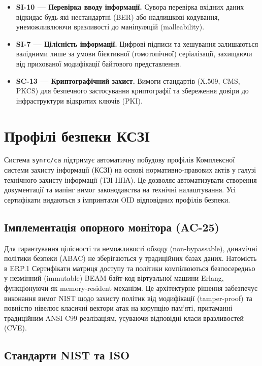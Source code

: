 \begin{itemize}
    \item \textbf{SI-10 — Перевірка вводу інформації.}
          Сувора перевірка вхідних даних відкидає будь-які нестандартні (BER) або надлишкові
          кодування, унеможливлюючи вразливості до маніпуляцій (malleability).

    \item \textbf{SI-7 — Цілісність інформації.}
          Цифрові підписи та хешування залишаються валідними лише за умови бієктивної
          (гомотопічної) серіалізації, захищаючи від прихованої модифікації байтового представлення.

    \item \textbf{SC-13 — Криптографічний захист.}
          Вимоги стандартів (X.509, CMS, PKCS) для безпечного застосування криптографії та
          збереження довіри до інфраструктури відкритих ключів (PKI).
\end{itemize}

\section{Профілі безпеки КСЗІ}

Система \texttt{synrc/ca} підтримує автоматичну побудову профілів Комплексної системи захисту
інформації (КСЗІ) на основі нормативно-правових актів у галузі технічного захисту інформації
(ТЗІ НПА). Це дозволяє автоматизувати створення документації та мапінг вимог законодавства на
технічні налаштування. Усі сертифікати видаються з імпринтами OID відповідних профілів безпеки.

\subsection{Імплементація опорного монітора (AC-25)}

Для гарантування цілісності та неможливості обходу (non-bypassable), динамічні політики безпеки
(ABAC) не зберігаються у традиційних базах даних. Натомість в ERP.1 Сертифікати матриця доступу
та політики компілюються безпосередньо у незмінний (immutable) BEAM байт-код віртуальної машини
Erlang, функціонуючи як memory-resident механізм. Це архітектурне рішення забезпечує виконання
вимог NIST щодо захисту політик від модифікації (tamper-proof) та повністю нівелює класичні
вектори атак на корупцію пам'яті, притаманні традиційним ANSI C99 реалізаціям, усуваючи
відповідні класи вразливостей (CVE).

\subsection{Стандарти NIST та ISO}

